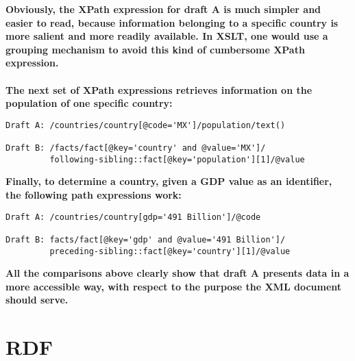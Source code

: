 \documentclass[a4paper, 12pt]{scrartcl}
\begin{document}
\noindent \textbf{Obviously, the XPath expression for draft A is much simpler and easier to read, because information belonging to a specific country is more salient and more readily available. In XSLT, one would use a grouping mechanism to avoid this kind of cumbersome XPath expression. \\ \\ The next set of XPath expressions retrieves information on the population of one specific country:}
\lstset{language=XML}
\begin{lstlisting}
Draft A: /countries/country[@code='MX']/population/text()

Draft B: /facts/fact[@key='country' and @value='MX']/
         following-sibling::fact[@key='population'][1]/@value
\end{lstlisting}

\noindent \textbf{Finally, to determine a country, given a GDP value as an identifier, the following path expressions work:}
\lstset{language=XML}
\begin{lstlisting}
Draft A: /countries/country[gdp='491 Billion']/@code

Draft B: facts/fact[@key='gdp' and @value='491 Billion']/
         preceding-sibling::fact[@key='country'][1]/@value
\end{lstlisting}

\noindent \textbf{All the comparisons above clearly show that draft A presents data in a more accessible way, with respect to the purpose the XML document should serve.}




%
%

\section{RDF}
\end{document}
